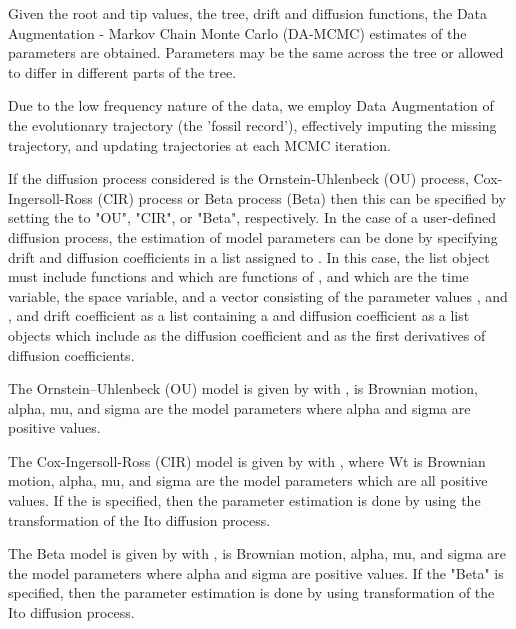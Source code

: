 \documentclass[letterpaper]{book}
\begin{document}
%
\begin{Details}\relax
Given the root and tip values, the tree, drift and diffusion functions, the Data Augmentation - Markov Chain Monte Carlo (DA-MCMC) estimates of the parameters are obtained. Parameters may be the same across the tree or allowed to differ in different parts of the tree.

Due to the low frequency nature of the data, we employ Data Augmentation of the evolutionary trajectory (the 'fossil record'), effectively imputing the missing trajectory, and updating trajectories at each MCMC iteration.

If the diffusion process considered is the Ornstein-Uhlenbeck (OU) process, Cox-Ingersoll-Ross (CIR) process or Beta process (Beta) then this can be specified by setting the  to "OU", "CIR", or "Beta", respectively. In the case of a user-defined diffusion process, the estimation of model parameters can be done by specifying drift and diffusion coefficients in a list assigned to . In this case, the list object  must include functions  and  which are functions of ,  and  which are the time variable, the space variable, and a vector consisting of the parameter values ,  and , and drift coefficient as a list containing a  and diffusion coefficient as a list objects which include  as the diffusion coefficient and  as the first derivatives of diffusion coefficients.

The Ornstein–Uhlenbeck (OU) model is given by  with ,  is Brownian motion, alpha, mu, and sigma are the model parameters where alpha and sigma are positive values.

The Cox-Ingersoll-Ross (CIR) model is given by  with , where Wt is
Brownian motion, alpha, mu, and sigma are the model parameters which
are all positive values. If the  is specified, then the parameter estimation is done by using the transformation  of the Ito diffusion process.

The Beta model is given by  with ,  is Brownian motion, alpha, mu, and sigma are the model parameters where alpha and sigma are positive values. If the  "Beta" is specified, then the parameter estimation is done by using transformation  of the Ito diffusion process.
\end{Details}
\end{document}
